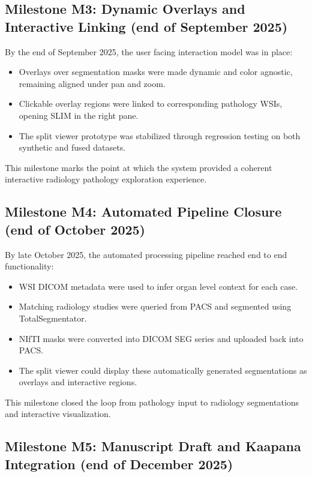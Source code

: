\documentclass[11pt,a4paper]{article}
\begin{document}
\subsection{Milestone M3: Dynamic Overlays and Interactive Linking (end of September 2025)}

By the end of September 2025, the user facing interaction model was in place:
\begin{itemize}
    \item Overlays over segmentation masks were made dynamic and color agnostic, remaining aligned under pan and zoom.
    \item Clickable overlay regions were linked to corresponding pathology WSIs, opening SLIM in the right pane.
    \item The split viewer prototype was stabilized through regression testing on both synthetic and fused datasets.
\end{itemize}
This milestone marks the point at which the system provided a coherent interactive radiology pathology exploration experience.

\subsection{Milestone M4: Automated Pipeline Closure (end of October 2025)}

By late October 2025, the automated processing pipeline reached end to end functionality:
\begin{itemize}
    \item WSI DICOM metadata were used to infer organ level context for each case.
    \item Matching radiology studies were queried from PACS and segmented using TotalSegmentator.
    \item NIfTI masks were converted into DICOM SEG series and uploaded back into PACS.
    \item The split viewer could display these automatically generated segmentations as overlays and interactive regions.
\end{itemize}
This milestone closed the loop from pathology input to radiology segmentations and interactive visualization.

\subsection{Milestone M5: Manuscript Draft and Kaapana Integration (end of December 2025)}
\end{document}
